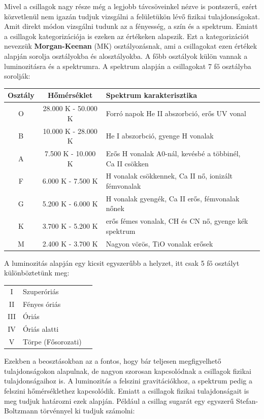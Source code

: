 \documentclass[../main.tex]{subfiles}
\begin{document}
Mivel a csillagok nagy része még a legjobb távcsöveinkel nézve is pontszerű, ezért közvetlenül nem igazán tudjuk vizsgálni a felületükön lévő fizikai tulajdonságokat. Amit direkt módon vizsgálni tudunk
az a fényesség, a szín és a spektrum. Emiatt a csillagok kategorizációja is ezeken az értékeken alapszik. Ezt a kategorizációt nevezzük \textbf{Morgan-Keenan} (MK) osztályozásnak, ami a csillagokat 
ezen értékek alapján sorolja osztályokba és alosztályokba. A főbb osztályok külön vannak a luminozitásra és a spektrumra. A spektrum alapján a csillagokat 7 fő osztályba sorolják:
\begin{center}
\begin{tabular}{cclc}
\hline
\hline
Osztály & Hőmérséklet & Spektrum karakterisztika  \\
\hline
O & 28.000 K - 50.000 K & Forró napok He II abszorbció, erős UV vonal  \\
B & 10.000 K - 28.000 K & He I abszorbció, gyenge H vonalak  \\
A & 7.500 K - 10.000 K & Erős H vonalak A0-nál, kevésbé a többinél, Ca II csökken \\
F & 6.000 K - 7.500 K & H vonalak csökkennek, Ca II nő, ionizált fémvonalak  \\
G & 5.200 K - 6.000 K & H vonalak gyengék, Ca II erős, fémvonalak nőnek  \\
K & 3.700 K - 5.200 K & erős fémes vonalak, CH és CN nő, gyenge kék spektrum  \\
M & 2.400 K - 3.700 K & Nagyon vörös, TiO vonalak erősek  \\
\hline
\hline
\end{tabular}
\end{center}
A luminozitás alapján egy kicsit egyszerűbb a helyzet, itt csak 5 fő osztályt különböztetünk meg:
\begin{center}
\begin{tabular}{clc}
\hline
\hline
I & Szuperóriás \\
II & Fényes óriás \\
III & Óriás \\
IV & Óriás alatti \\
V & Törpe (Fősorozati) \\
\hline
\hline
\end{tabular}
\end{center}
Ezekben a beosztásokban az a fontos, hogy bár teljesen megfigyelhető tulajdonságokon alapulnak, de nagyon szorosan kapcsolódnak a csillagok fizikai tulajdonságaihoz is. A luminozitás a felszini gravitációkhoz,
a spektrum pedig a felszini hőmérséklethez kapcsolódik. Emiatt a csillagok fizikai tulajdonságait is meg tudjuk határozni ezek alapján. Például a csillag sugarát egy egyszerű Stefan-Boltzmann törvénnyel ki tudjuk számolni:
\end{document}
